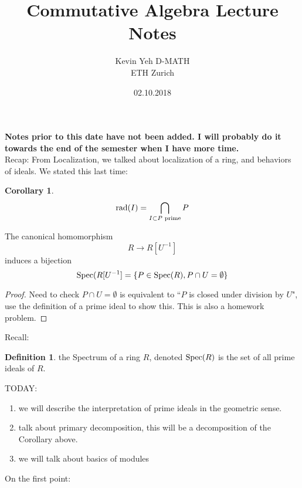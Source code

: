\documentclass[12pt]{article}
\newcommand{\rad}{\textup{rad}}
\newcommand{\spec}{\textup{Spec}}
\newcommand\inv[1]{#1^{-1}}
\newtheorem{corollary}[theorem]{Corollary}
\theoremstyle{definition}
\newtheorem{definition}[theorem]{Definition}
\begin{document}
\date{}

 
\title{Commutative Algebra Lecture Notes}
\author{Kevin Yeh
D-MATH \\ETH Zurich} 
 
\maketitle

\date{02.10.2018}
\textbf{Notes prior to this date have not been added. I will probably do it towards the end of the semester when I have more time.}\\
Recap: From Localization, we talked about localization of a ring, and behaviors of ideals. We stated this last time:
\begin{corollary}
\[
\rad (I) = \bigcap_{I \subset P\text{ prime}} P
\]
\end{corollary}
The canonical homomorphism
\[
R\longrightarrow R[\inv{U}]
\]
induces a bijection
\[
\spec(R[U^{-1}]= \{P \in \spec(R), P\cap U= \emptyset\}
\]
\begin{proof}
Need to check $P\cap U = \emptyset$ is equivalent to ``$P$ is closed under division by $U$", use the definition of a prime ideal to show this. This is also a homework problem. 
\end{proof}
Recall:
\begin{definition}
the Spectrum of a ring $R$, denoted $\spec(R)$ is the set of all prime ideals of $R$.
\end{definition}
TODAY:\\
\begin{enumerate}
    \item we will describe the interpretation of prime ideals in the geometric sense. 
    \item talk about primary decomposition, this will be a decomposition of the Corollary above.
    \item we will talk about basics of modules
\end{enumerate}
On the first point:
\end{document}
